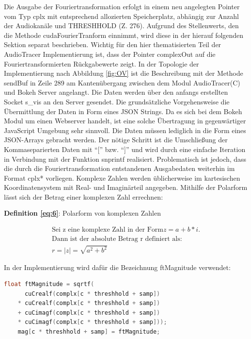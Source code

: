 Die Ausgabe der Fouriertransformation erfolgt in einem neu angelegten Pointer vom Typ cplx mit entsprechend allozierten Speicherplatz, abhängig zur Anzahl der Audiokanäle und THRESHHOLD (Z. 276). Aufgrund des Stellenwerts, den die Methode cudaFourierTranform einnimmt, wird diese in der hierauf folgenden Sektion separat beschrieben. Wichtig für den hier thematisierten Teil der AudioTracer Implementierung ist, dass der Pointer complexOut auf die Fouriertransformierten Rückgabewerte zeigt. In der Topologie der Implementierung nach Abbildung \ref{fig:OV} ist die Beschreibung mit der Methode sendBuf in Zeile 289 am Kantenübergang zwischen dem Modul AudioTracer(C) und Bokeh Server angelangt. Die Daten werden über den anfangs erstellten Socket s\_vis an den Server gesendet. Die grundsätzliche Vorgehensweise die Übermittlung der Daten in Form eines JSON Strings. Da es sich bei dem Bokeh Modul um einen Webserver handelt, ist eine solche Übertragung in gegenwärtiger JavaScript Umgebung sehr sinnvoll. Die Daten müssen lediglich in die Form eines JSON-Arrays gebracht werden. Der nötige Schritt ist die Umschließung der Kommaseparierten Daten mit \enquote{[} bzw. \enquote{]} und wird durch eine einfache Iteration in Verbindung mit der Funktion snprintf realisiert. Problematisch ist jedoch, dass die durch die Fouriertransformation entstandenen Ausgabedaten weiterhin im Format cplx* vorliegen. Komplexe Zahlen werden üblicherweise im kartesischen Koordinatensystem mit Real- und Imaginärteil angegeben. Mithilfe der Polarform lässt sich der Betrag einer komplexen Zahl errechnen:
\begin{flushleft}
	\textbf{Definition \eqref{eq:6}}: Polarform von komplexen Zahlen
\end{flushleft}
\vspace{\baselineskip}
\begin{equation}
	\begin{gathered}
		\text{Sei z eine komplexe Zahl in der Form} z = a + b * i. \\
		\text{Dann ist der absolute Betrag r definiert als:} \\
				r = |z| = \sqrt{a^{2} + b^{2}}
	\end{gathered}\label{eq:6}
\end{equation}

In der Implementierung wird dafür die Bezeichnung ftMagnitude verwendet:

\begin{lstlisting}[language=C, frame=none]
	float ftMagnitude = sqrtf(
	  cuCrealf(complx[c * threshhold + samp]) 
	* cuCrealf(complx[c * threshhold + samp]) 
	+ cuCimagf(complx[c * threshhold + samp]) 
	* cuCimagf(complx[c * threshhold + samp]));
	mag[c * threshhold + samp] = ftMagnitude;
\end{lstlisting}

